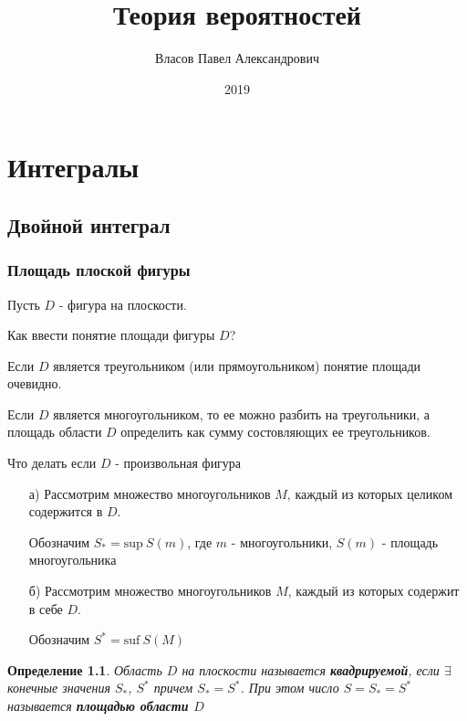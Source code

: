 \documentclass[a4paper, 14pt]{report}
\author{Власов Павел Александрович}
\title{Теория вероятностей}
\date{2019}
\newtheorem{defenition}{Определение}[section]
\begin{document}
\maketitle

\tableofcontents
\clearpage

\chapter{Интегралы}

\section{Двойной интеграл}

\subsection{Площадь плоской фигуры}

Пусть $D$ - фигура на плоскости.

Как ввести понятие площади фигуры $D$?

Если $D$ является треугольником (или прямоугольником) понятие площади очевидно.

Если $D$ является многоугольником, то ее можно разбить на треугольники, а площадь области $D$ определить как сумму состовляющих ее треугольников.

Что делать если $D$ - произвольная фигура

\begin{enumerate}

    \item[а)] Рассмотрим множество многоугольников $M$, каждый из которых целиком содержится в $D$.

    Обозначим $S_* = \text{sup}\ S(m)$, где $m$ - многоугольники, $S(m)$ - площадь многоугольника

    \item[б)] Рассмотрим множество многоугольников $M$, каждый из которых содержит в себе $D$.

    Обозначим $S^* = \text{suf}\ S(M)$

\end{enumerate}

\begin{defenition}
    Область $D$ на плоскости называется \textbf{квадрируемой}, если $\exists$ конечные значения $S_*$, $S^*$ причем $S_* = S^*$. При этом число $S = S_* = S^*$ называется \textbf{площадью области $D$}
\end{defenition}
\end{document}
